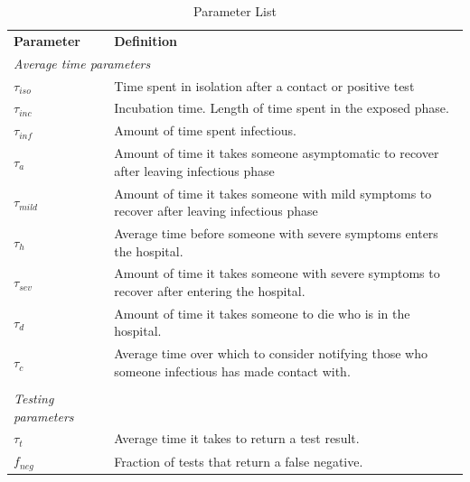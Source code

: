\documentclass[notitlepage, superscriptaddress]{revtex4-2}
\begin{document}
\begin{table}[]
\caption{Parameter List}
\label{tab:parameters}
\begin{tabular}{ll}
\textbf{Parameter}          & \textbf{Definition}                                                                                \\
\multicolumn{2}{l}{\textit{Average time parameters}}                                                                             \\
$\tau_{iso}$                & Time spent in isolation after a contact or positive test                                           \\
$\tau_{inc}$                & Incubation time. Length of time spent in the exposed phase.                                        \\
$\tau_{inf}$                & Amount of time spent infectious.                                                                   \\
$\tau_{a}$                  & Amount of time it takes someone asymptomatic to recover after leaving infectious phase             \\
$\tau_{mild}$               & Amount of time it takes someone with mild symptoms to recover after leaving infectious phase       \\
$\tau_{h}$                  & Average time before someone with severe symptoms enters the hospital.                              \\
$\tau_{sev}$                & Amount of time it takes someone with severe symptoms to recover after entering the hospital.       \\
$\tau_{d}$                  & Amount of time it takes someone to die who is in the hospital.                                     \\
$\tau_{c}$          & Average time over which to consider notifying those who someone infectious has made contact with.        \\
                            &                                                                                                    \\
\textit{Testing parameters} &                                                                                                    \\
$\tau_{t}$                  & Average time it takes to return a test result.                                                     \\
$f_{neg}$                   & Fraction of tests that return a false negative.                                                    \\

\end{tabular}
\end{table}
\end{document}
